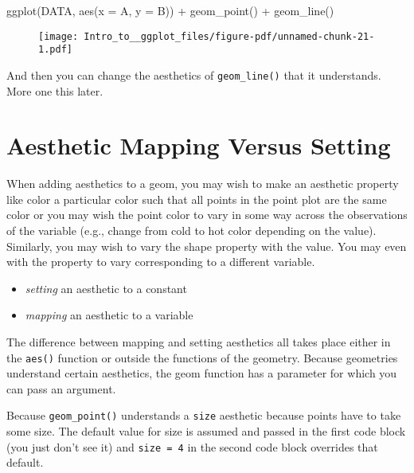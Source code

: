 \documentclass[
  letterpaper,
  DIV=11,
  numbers=noendperiod]{scrartcl}
\newenvironment{Shaded}{\begin{snugshade}}{\end{snugshade}}
\newcommand{\AttributeTok}[1]{\textcolor[rgb]{0.40,0.45,0.13}{#1}}
\newcommand{\FunctionTok}[1]{\textcolor[rgb]{0.28,0.35,0.67}{#1}}
\newcommand{\NormalTok}[1]{\textcolor[rgb]{0.00,0.23,0.31}{#1}}
\newcommand{\SpecialCharTok}[1]{\textcolor[rgb]{0.37,0.37,0.37}{#1}}
\providecommand{\tightlist}{%
  \setlength{\itemsep}{0pt}\setlength{\parskip}{0pt}}\usepackage{longtable,booktabs,array}
\begin{document}
\begin{Shaded}
\begin{Highlighting}[]
\FunctionTok{ggplot}\NormalTok{(DATA, }\FunctionTok{aes}\NormalTok{(}\AttributeTok{x =}\NormalTok{ A, }\AttributeTok{y =}\NormalTok{ B)) }\SpecialCharTok{+}
  \FunctionTok{geom\_point}\NormalTok{() }\SpecialCharTok{+}
  \FunctionTok{geom\_line}\NormalTok{()}
\end{Highlighting}
\end{Shaded}

\begin{figure}[H]

{\centering \texttt{[image: Intro\_to\_\_ggplot\_files/figure-pdf/unnamed-chunk-21-1.pdf]}

}

\end{figure}

And then you can change the aesthetics of \texttt{geom\_line()} that it
understands. More one this later.

\hypertarget{aesthetic-mapping-versus-setting}{%
\section{\texorpdfstring{\textbf{Aesthetic Mapping Versus
Setting}}{Aesthetic Mapping Versus Setting}}\label{aesthetic-mapping-versus-setting}}

When adding aesthetics to a geom, you may wish to make an aesthetic
property like color a particular color such that all points in the point
plot are the same color or you may wish the point color to vary in some
way across the observations of the variable (e.g., change from cold to
hot color depending on the value). Similarly, you may wish to vary the
shape property with the value. You may even with the property to vary
corresponding to a different variable.

\begin{itemize}
\tightlist
\item
  \emph{setting} an aesthetic to a constant
\item
  \emph{mapping} an aesthetic to a variable
\end{itemize}

The difference between mapping and setting aesthetics all takes place
either in the \texttt{aes()} function or outside the functions of the
geometry. Because geometries understand certain aesthetics, the geom
function has a parameter for which you can pass an argument.

Because \texttt{geom\_point()} understands a \texttt{size} aesthetic
because points have to take some size. The default value for size is
assumed and passed in the first code block (you just don't see it) and
\texttt{size\ =\ 4} in the second code block overrides that default.
\end{document}
